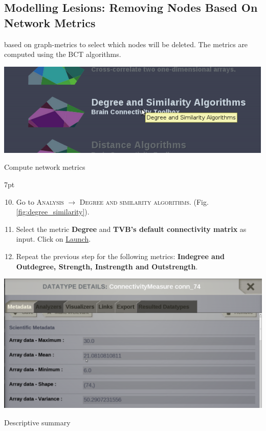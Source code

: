 \documentclass{tufte-handout}
\newenvironment{formal}{%
  \def\FrameCommand{%
    \hspace{1pt}%
    {\color{DarkBlue}\vrule width 2pt}%
    {\color{formalshade}\vrule width 4pt}%
    \colorbox{formalshade}%
  }%
  \MakeFramed{\advance\hsize-\width\FrameRestore}%
  \noindent\hspace{-4.55pt}%
  \begin{adjustwidth}{}{7pt}%
  \vspace{2pt}\vspace{2pt}%
}
{%
  \vspace{2pt}\end{adjustwidth}\endMakeFramed%
}
\begin{document}
\subsection{Modelling Lesions: Removing Nodes Based On Network Metrics}\label{sec:steps}

 based on graph-metrics to select which
nodes will be deleted. The metrics are computed using the BCT  algorithms.  


\begin{marginfigure}
  \includegraphics[width=\linewidth]{Handout_UI_ModellingStructuralLesions_Analysis}%
  \caption{Compute network metrics}%
  \label{fig:degree_similarity}%
\end{marginfigure}

\begin{formal}
  \begin{enumerate}[resume]
  \setcounter{enumi}{9}
  \item Go to \textsc{Analysis} $\rightarrow$ \textsc{Degree and similarity algorithms}.  (Fig. \ref{fig:degree_similarity}).
  \item Select the metric \textbf{Degree} and \textbf{TVB's default connectivity matrix} as input. Click on \underline{Launch}.
  \item Repeat the previous step for the following metrics: \textbf{Indegree and Outdegree, Strength, Instrength and Outstrength}.
  \end{enumerate}
\end{formal}

\begin{marginfigure}
  \includegraphics[width=\linewidth]{Handout_UI_ModellingStructuralLesions_AnalysisResult}%
  \caption{Descriptive summary}%
  \label{fig:step_02}%
\end{marginfigure}
\end{document}

